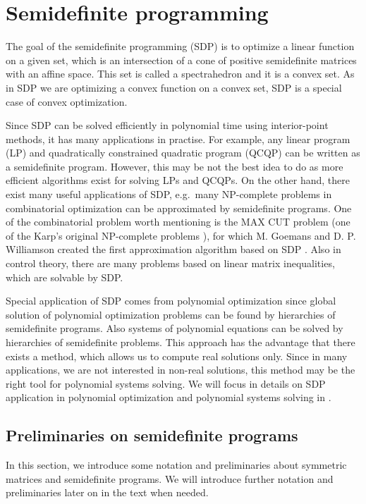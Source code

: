 \chapter{Semidefinite programming}
The goal of the semidefinite programming (SDP) is to optimize a linear function on a given set, which is an intersection of a cone of positive semidefinite matrices with an affine space.
This set is called a spectrahedron and it is a convex set.
As in SDP we are optimizing a convex function on a convex set, SDP is a special case of convex optimization.

Since SDP can be solved efficiently in polynomial time using interior-point methods, it has many applications in practise.
For example, any linear program (LP) and quadratically constrained quadratic program (QCQP) can be written as a semidefinite program.
However, this may be not the best idea to do as more efficient algorithms exist for solving LPs and QCQPs.
On the other hand, there exist many useful applications of SDP, e.g.\ many NP-complete problems in combinatorial optimization can be approximated by semidefinite programs. 
One of the combinatorial problem worth mentioning is the MAX CUT problem (one of the Karp's original NP-complete problems \cite{karp1972}), for which M. Goemans and D. P. Williamson created the first approximation algorithm based on SDP \cite{max-cut}.
Also in control theory, there are many problems based on linear matrix inequalities, which are solvable by SDP.\@

Special application of SDP comes from polynomial optimization since global solution of polynomial optimization problems can be found by hierarchies of semidefinite programs.
Also systems of polynomial equations can be solved by hierarchies of semidefinite problems.
This approach has the advantage that there exists a method, which allows us to compute real solutions only.
Since in many applications, we are not interested in non-real solutions, this method may be the right tool for polynomial systems solving.
We will focus in details on SDP application in polynomial optimization and polynomial systems solving in .

\section{Preliminaries on semidefinite programs}
In this section, we introduce some notation and preliminaries about symmetric matrices and semidefinite programs.
We will introduce further notation and preliminaries later on in the text when needed.

